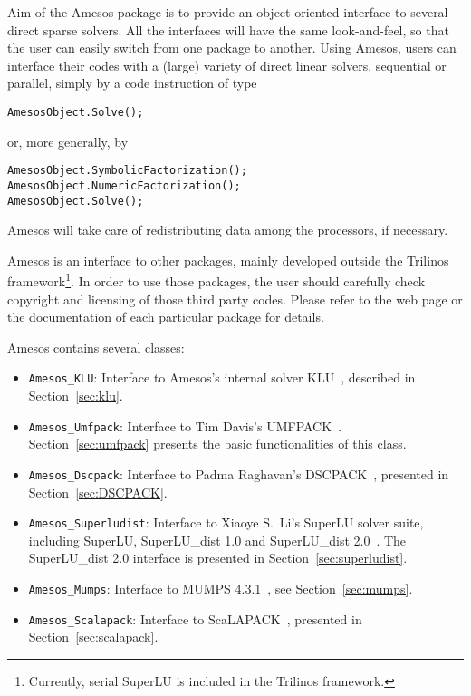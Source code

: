 \documentclass[11pt,letter]{article}
\begin{document}
Aim of the Amesos package is to provide an object-oriented interface to
several direct sparse solvers. All the interfaces will have the same
look-and-feel, so that the user can easily switch from one package to
another. Using Amesos, users can interface their codes with a (large)
variety of direct linear solvers, sequential or parallel, simply by a
code instruction of type
\begin{verbatim}
AmesosObject.Solve();
\end{verbatim}
or, more generally, by
\begin{verbatim}
AmesosObject.SymbolicFactorization();
AmesosObject.NumericFactorization();
AmesosObject.Solve();
\end{verbatim}
Amesos will take care of redistributing data among the
processors, if necessary.

Amesos is an interface to other packages, mainly developed outside the
Trilinos framework\footnote{Currently, serial SuperLU is included in the
  Trilinos framework.}. In order to use those packages, the user should
carefully check copyright and licensing of those third party codes.
Please refer to the web page or the documentation of each particular
package for details.

Amesos contains several classes: 
\begin{itemize}
\item \verb!Amesos_KLU!: Interface to Amesos's internal solver
  KLU~\cite{KLU}, described in Section~\ref{sec:klu}.
\item \verb!Amesos_Umfpack!: Interface to Tim Davis's
  UMFPACK~\cite{umfpack-home-page}. Section~\ref{sec:umfpack} presents the basic
  functionalities of this class.
\item \verb!Amesos_Dscpack!: Interface to Padma Raghavan's
  DSCPACK~\cite{dscpack-home-page}, presented in Section~\ref{sec:DSCPACK}.
\item \verb!Amesos_Superludist!: Interface to Xiaoye S.~Li's SuperLU
  solver suite, including SuperLU, SuperLU\_dist 1.0 and SuperLU\_dist
  2.0~\cite{superlu-home-page}. The SuperLU\_dist 2.0 interface is
  presented in Section~\ref{sec:superludist}.
\item \verb!Amesos_Mumps!: Interface to MUMPS 4.3.1~\cite{mumps-home-page}, see
  Section~\ref{sec:mumps}.
\item \verb!Amesos_Scalapack!: Interface to ScaLAPACK~\cite{scalapack}, 
  presented in Section~\ref{sec:scalapack}.
\end{itemize}
\end{document}
